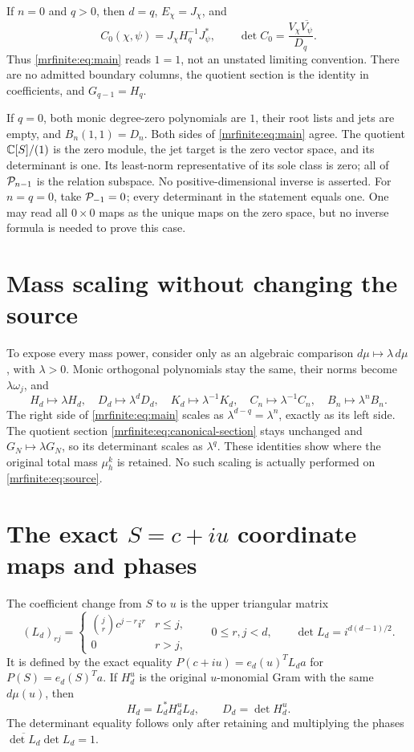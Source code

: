 If \(n=0\) and \(q>0\), then \(d=q\), \(E_\chi=J_\chi\), and
\[
 C_0(\chi,\psi)=J_\chi H_q^{-1}J_\psi^*,\qquad
 \det C_0=\frac{V_\chi\overline{V_\psi}}{D_q}.
\]
Thus \eqref{mrfinite:eq:main} reads \(1=1\), not an unstated limiting convention.
There are no admitted boundary columns, the quotient section is the
identity in coefficients, and \(G_{q-1}=H_q\).

If \(q=0\), both monic degree-zero polynomials are \(1\), their root
lists and jets are empty, and \(B_n(1,1)=D_n\). Both sides of
\eqref{mrfinite:eq:main} agree. The quotient \(\mathbb C[S]/(1)\) is the zero module,
the jet target is the zero vector space, and its determinant is one.
Its least-norm representative of its sole class is zero; all of
\(\mathcal P_{n-1}\) is the relation subspace. No positive-dimensional inverse
is asserted. For \(n=q=0\), take \(\mathcal P_{-1}=0\); every determinant in
the statement equals one. One may read all \(0\times0\) maps as the
unique maps on the zero space, but no inverse formula is needed to prove
this case.

\section{Mass scaling without changing the source}\label{mrfinite:sec:mass}

To expose every mass power, consider only as an algebraic comparison
\(d\mu\mapsto\lambda\,d\mu\), with \(\lambda>0\). Monic
orthogonal polynomials stay the same, their norms become
\(\lambda\omega_j\), and
\[
 H_d\mapsto\lambda H_d,\quad D_d\mapsto\lambda^dD_d,
 \quad K_d\mapsto\lambda^{-1}K_d,\quad
 C_n\mapsto\lambda^{-1}C_n,\quad B_n\mapsto\lambda^nB_n.
\]
The right side of \eqref{mrfinite:eq:main} scales as
\(\lambda^{d-q}=\lambda^n\), exactly as its left side.
The quotient section \eqref{mrfinite:eq:canonical-section} stays unchanged and
\(G_N\mapsto\lambda G_N\), so its determinant scales as
\(\lambda^q\). These identities show where the original total mass
\(\mu_h^k\) is retained. No such scaling is actually performed on
\eqref{mrfinite:eq:source}.

\section{The exact \(S=c+iu\) coordinate maps and phases}\label{mrfinite:sec:phases}

The coefficient change from \(S\) to \(u\) is the upper triangular
matrix
\[
 (L_d)_{rj}=\begin{cases}\binom jr c^{j-r}i^r&r\leq j,\\0&r>j,
 \end{cases}
 \qquad 0\leq r,j<d,
 \qquad\det L_d=i^{d(d-1)/2}.
\]
It is defined by the exact equality
\(P(c+iu)=e_d(u)^TL_da\) for \(P(S)=e_d(S)^Ta\).
If \(H_d^{u}\) is the original \(u\)-monomial Gram with the same
\(d\mu(u)\), then
\begin{equation}\label{mrfinite:eq:coordinategram}
 H_d=L_d^*H_d^{u}L_d,\qquad D_d=\det H_d^{u}.
\end{equation}
The determinant equality follows only after retaining and multiplying
the phases \(\overline{\det L_d}\det L_d=1\).

